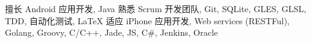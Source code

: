 
\begin{cvskills}
	\cvskill
		{擅长}
		{Android 应用开发, Java}
	\cvskill
		{熟悉}
		{Scrum 开发团队, Git, SQLite, GLES, GLSL, TDD, 自动化测试, LaTeX}
	\cvskill
		{适应}
		{iPhone 应用开发, Web services (RESTFul), Golang, Groovy, C/C++, Jade, JS, C\#, Jenkins, Oracle}
\end{cvskills}

